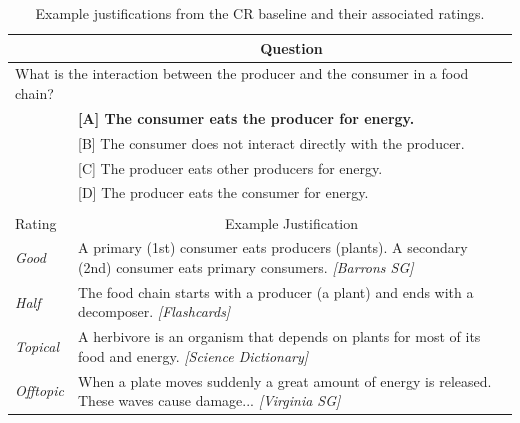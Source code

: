{%
%
\begin{table}[t]
\caption{{ Example justifications from the CR baseline and their associated ratings. }} %
\begin{center}
\begin{footnotesize}
\begin{tabularx}{\textwidth}{p{1cm}p{11.5cm}}
\hline
\multicolumn{1}{c}{} & \multicolumn{1}{c}{Question} \\
\hline			
\multicolumn{2}{l}{	What is the interaction between the producer and the consumer in a food chain?} \\
		&	\textbf{[A] The consumer eats the producer for energy.}  \\
		&  [B] The consumer does not interact directly with the producer. \\
			&   [C] The producer eats other producers for energy.   \\
			& [D] The producer eats the consumer for energy. \\

\multicolumn{1}{c}{} & \multicolumn{1}{c}{} \\				
\hline
\multicolumn{1}{l}{Rating} & \multicolumn{1}{c}{Example Justification} \\
\hline			
{\em Good }		&	A primary (1st) consumer eats producers (plants). A secondary (2nd) consumer eats primary consumers. {\em [Barrons SG]}  	\\
{\em Half }		&	The food chain starts with a producer (a plant) and ends with a decomposer. {\em [Flashcards]} \\
{\em Topical }	&   A herbivore is an organism that depends on plants for most of its food and energy. {\em [Science Dictionary]} \\
{\em Offtopic }	&	When a plate moves suddenly a great amount of energy is released.  These waves cause damage...  {\em [Virginia SG]} \\
\end{tabularx}
\end{footnotesize}
\label{tab:justificationsIRexamples}


\end{center}
\end{table}}
